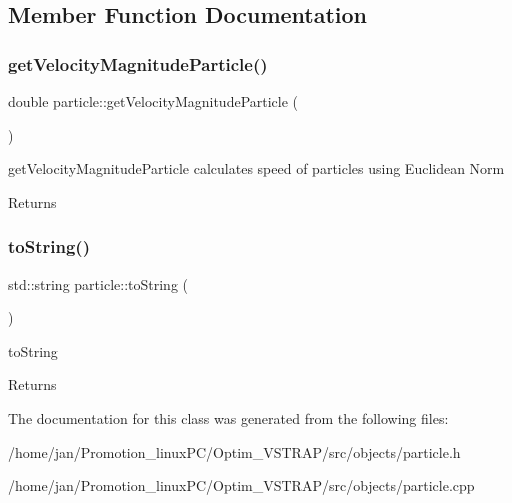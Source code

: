 \subsection{Member Function Documentation}
\mbox{\label{classparticle_a4746319805ea7d18c4a3eac998b02043}} 
\subsubsection{\texorpdfstring{get\+Velocity\+Magnitude\+Particle()}{getVelocityMagnitudeParticle()}}
{\footnotesize\ttfamily double particle\+::get\+Velocity\+Magnitude\+Particle (\begin{DoxyParamCaption}{ }\end{DoxyParamCaption})}



get\+Velocity\+Magnitude\+Particle calculates speed of particles using Euclidean Norm 

\begin{DoxyReturn}{Returns}

\end{DoxyReturn}
\mbox{\label{classparticle_a48098f62cff10f99c3676ac12a168f02}} 
\subsubsection{\texorpdfstring{to\+String()}{toString()}}
{\footnotesize\ttfamily std\+::string particle\+::to\+String (\begin{DoxyParamCaption}{ }\end{DoxyParamCaption})}



to\+String 

\begin{DoxyReturn}{Returns}

\end{DoxyReturn}


The documentation for this class was generated from the following files\+:\begin{DoxyCompactItemize}
\item 
/home/jan/\+Promotion\+\_\+linux\+P\+C/\+Optim\+\_\+\+V\+S\+T\+R\+A\+P/src/objects/particle.\+h\item 
/home/jan/\+Promotion\+\_\+linux\+P\+C/\+Optim\+\_\+\+V\+S\+T\+R\+A\+P/src/objects/particle.\+cpp\end{DoxyCompactItemize}
